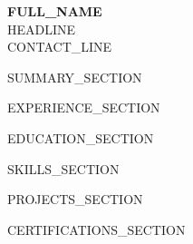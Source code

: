 \documentclass[a4paper,11pt]{article}
\begin{document}
\begin{center}
    {\LARGE \textbf{{{FULL_NAME}}}} \\ \vspace{3pt}
    {\large {{HEADLINE}}} \\ \vspace{3pt}
    \small {{CONTACT_LINE}}
\end{center}
\vspace{-6pt}

{{SUMMARY_SECTION}}

{{EXPERIENCE_SECTION}}

{{EDUCATION_SECTION}}

{{SKILLS_SECTION}}

{{PROJECTS_SECTION}}

{{CERTIFICATIONS_SECTION}}
\end{document}
